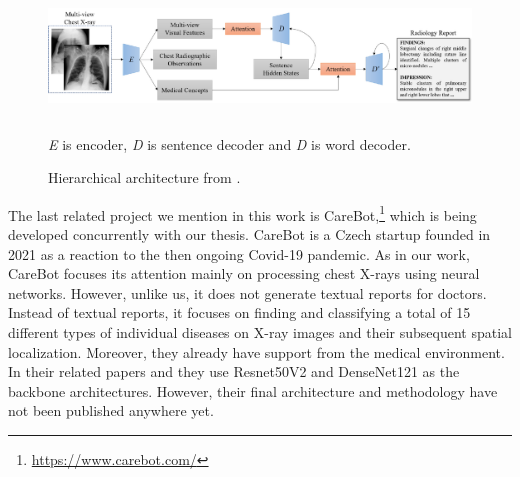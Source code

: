 \begin{figure}[h]\centering
\includegraphics[width=145mm, height=32mm]{../img/YuanExample}
\caption{Hierarchical architecture from \citet{yuan2019automatic}.}
\label{fig07:YuanExample}

\textit{E} is encoder, \textit{D} is sentence decoder and \textit{D\textquotesingle} is word decoder.
\end{figure}

The last related project we mention in this work is CareBot,\footnote[15]{\url{https://www.carebot.com/}} which is being developed concurrently with our thesis. CareBot is a Czech startup founded in 2021 as a reaction to the then ongoing Covid-19 pandemic. As in our work, CareBot focuses its attention mainly on processing chest X-rays using neural networks. However, unlike us, it does not generate textual reports for doctors. Instead of textual reports, it focuses on finding and classifying a total of 15 different types of individual diseases on X-ray images and their subsequent spatial localization. Moreover, they already have support from the medical environment. In their related papers \citep{kvak2022towards} and \citep{kvak2021carebot} they use Resnet50V2 and DenseNet121 as the backbone architectures. However, their final architecture and methodology have not been published anywhere yet.











